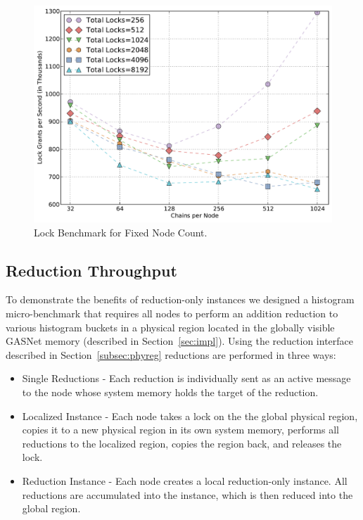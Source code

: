\begin{figure}
\begin{center}
\includegraphics[scale=0.33]{figs/fixed_node_lock.pdf}
\end{center}
\vspace{-2mm}
\caption{Lock Benchmark for Fixed Node Count.\label{fig:fixednode}}
\vspace{-4mm}
\end{figure}


\subsection{Reduction Throughput}
\label{subsec:reducmicro}
To demonstrate the benefits of reduction-only instances we designed
a histogram micro-benchmark that requires all nodes to perform an addition reduction to various histogram
buckets in a physical region located in the globally visible GASNet memory (described in 
Section~\ref{sec:impl}).  Using the reduction interface described in Section~\ref{subsec:phyreg}
reductions are performed in three ways:

\begin{itemize} \itemsep1pt \parskip0pt 
\item Single Reductions - Each reduction is individually sent as an active message to the node whose
system memory holds the target of the reduction.
\item Localized Instance - Each node takes a lock on the the global physical region, copies it to a new physical
region in its own system memory, performs all reductions to the localized region, copies the region back, and releases the lock.
\item Reduction Instance - Each node creates a local reduction-only instance.
All reductions are accumulated into the instance, which is then reduced into the global region.
\end{itemize}

